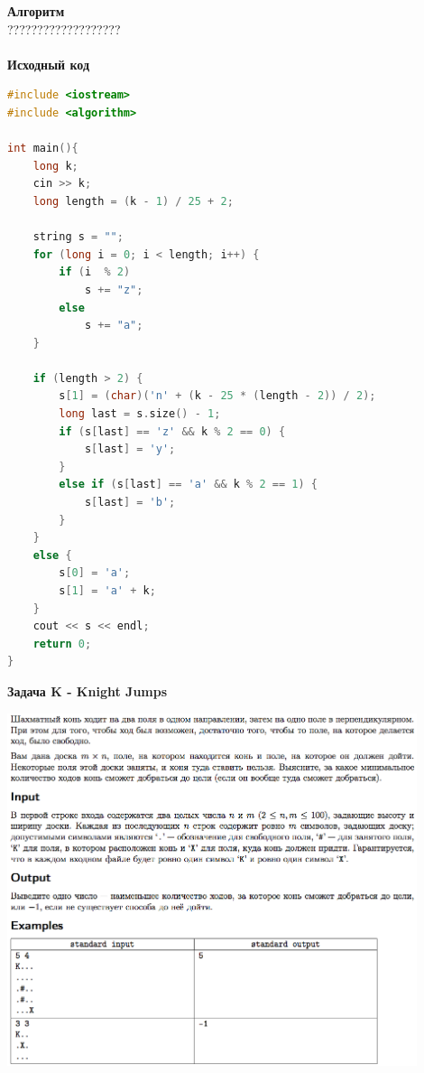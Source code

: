\documentclass[a4paper,12pt]{article}
\begin{document}
\textbf{{\large Алгоритм}} \\
{\Huge ???????????????????} \\ 
\\
\textbf{{\large Исходный код}}
\begin{lstlisting}[language=C++]
#include <iostream>
#include <algorithm>

int main(){
    long k;
    cin >> k;
    long length = (k - 1) / 25 + 2;
    
    string s = "";
    for (long i = 0; i < length; i++) {
        if (i  % 2)
            s += "z";
        else
            s += "a";
    }
    
    if (length > 2) {
        s[1] = (char)('n' + (k - 25 * (length - 2)) / 2);
        long last = s.size() - 1;
        if (s[last] == 'z' && k % 2 == 0) {
            s[last] = 'y';
        }
        else if (s[last] == 'a' && k % 2 == 1) {
            s[last] = 'b';
        }
    }
    else {
        s[0] = 'a';
        s[1] = 'a' + k;
    }
    cout << s << endl;
    return 0;
}
\end{lstlisting}

\textbf{{\large Задача K - Knight Jumps}} \\
\begin{center}
\includegraphics[width=0.9\textwidth]{OC_America/OC_America_K.png}\\ [1cm]
\end{center}
\newpage
\end{document}
